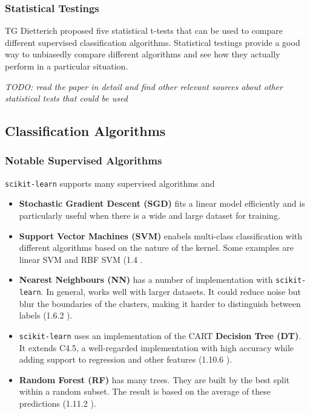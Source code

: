 \documentclass[lit_review.tex]{subfiles}
\begin{document}
\subsubsection{Statistical Testings}
TG Dietterich \cite{t-test-paper} proposed five statistical t-tests that can be used to compare different supervised classification algorithms. Statistical testings provide a good way to unbiasedly compare different algorithms and see how they actually perform in a particular situation.

\textit{TODO: read the paper in detail and find other relevant sources about other statistical tests that could be used\cite{t-test-paper}}


\newpage
\subsection{Classification Algorithms}

\subsubsection{Notable Supervised Algorithms}

\texttt{scikit-learn} supports many supervised algorithms and 
\begin{itemize}
  \item \textbf{Stochastic Gradient Descent (SGD)} fits a linear model efficiently and is particularly useful when there is a wide and large dataset for training. 

  \item \textbf{Support Vector Machines (SVM)} enabels multi-class classification with different algorithms based on the nature of the kernel. Some examples are linear SVM and RBF SVM (1.4 \cite{scikit-docs-supervised}.

  \item \textbf{Nearest Neighbours (NN)} has a number of implementation with \texttt{scikit-learn}. In general, works well with larger datasets. It could reduce noise but blur the boundaries of the clusters, making it harder to distinguish between labels (1.6.2 \cite{scikit-doccs-supervised}). 

  \item \texttt{scikit-learn} uses an implementation of the CART \textbf{Decision Tree (DT)}. It extends C4.5, a well-regarded implementation with high accuracy while adding support to regression and other features (1.10.6 \cite{scikit-docs-supervised}). 

  \item \textbf{Random Forest (RF)} has many trees. They are built by the best split within a random subset. The result is based on the average of these predictions (1.11.2 \cite{scikit-docs-supervised}).
\end{itemize}
\end{document}
